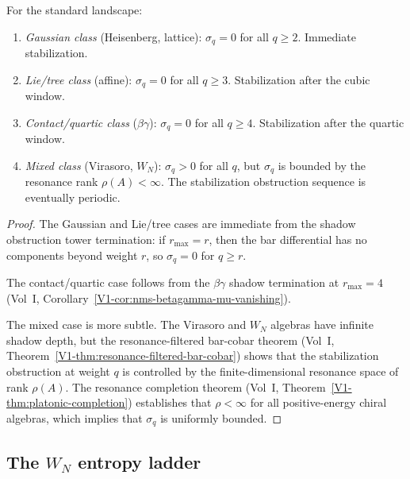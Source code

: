 \begin{proposition}
For the standard landscape:
\begin{enumerate}[leftmargin=2.4em]
\item \emph{Gaussian class} (Heisenberg, lattice):
$\sigma_q = 0$ for all $q \ge 2$. Immediate stabilization.

\item \emph{Lie/tree class} (affine):
$\sigma_q = 0$ for all $q \ge 3$. Stabilization after the cubic window.

\item \emph{Contact/quartic class} ($\beta\gamma$):
$\sigma_q = 0$ for all $q \ge 4$. Stabilization after the quartic window.

\item \emph{Mixed class} (Virasoro, $W_N$):
$\sigma_q > 0$ for all $q$, but $\sigma_q$ is bounded by the resonance
rank $\rho(A) < \infty$. The stabilization obstruction sequence is
eventually periodic.
\end{enumerate}
\end{proposition}

\begin{proof}
The Gaussian and Lie/tree cases are immediate from the shadow obstruction tower
termination: if $r_{\max} = r$, then the bar differential has no
components beyond weight $r$, so $\sigma_q = 0$ for $q \ge r$.

The contact/quartic case follows from the $\beta\gamma$ shadow
termination at $r_{\max} = 4$
(Vol~I, Corollary~\ref*{V1-cor:nms-betagamma-mu-vanishing}).

The mixed case is more subtle. The Virasoro and $W_N$ algebras have
infinite shadow depth, but the resonance-filtered bar-cobar theorem
(Vol~I, Theorem~\ref*{V1-thm:resonance-filtered-bar-cobar})
shows that the stabilization obstruction at weight $q$ is controlled
by the finite-dimensional resonance space of rank $\rho(A)$.
The resonance completion theorem
(Vol~I, Theorem~\ref*{V1-thm:platonic-completion})
establishes that $\rho < \infty$ for all positive-energy chiral algebras,
which implies that $\sigma_q$ is uniformly bounded.
\end{proof}

\subsection{The $W_N$ entropy ladder}

